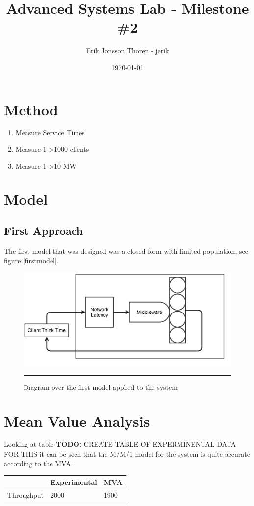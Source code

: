 \documentclass[a4paper, 11pt]{article}
\title{Advanced Systems Lab - Milestone \#2}
\author{Erik Jonsson Thoren - jerik\\}
\date{\today}
\newcommand{\TODO}[1]{\textbf{TODO:} #1}
\begin{document}
\maketitle

\section{Method}
\begin{enumerate}
	\item Measure Service Times
	\item Measure 1->1000 clients
	\item Measure 1->10 MW
\end{enumerate}

\section{Model}
\subsection{First Approach}
The first model that was designed was a closed form with limited population, see figure \ref{firstmodel}.

\begin{figure}[ch!]
	\centering
		\includegraphics[width=0.8\linewidth]{firstmodel}
		\rule{35em}{0.5pt}
	\caption{Diagram over the first model applied to the system}
	\label{fig:sl1}
\end{figure}


\section{Mean Value Analysis}
Looking at table \TODO{CREATE TABLE OF EXPERMINENTAL DATA FOR THIS} it can be seen that the M/M/1 model for the system is quite accurate according to the MVA.

\begin{table}
    \begin{tabular}{|l|l|l|}
    \hline
    ~          & Experimental & MVA  \\ \hline
    Throughput & 2000         & 1900 \\ \hline
    \end{tabular}
\end{table}
\end{document}
